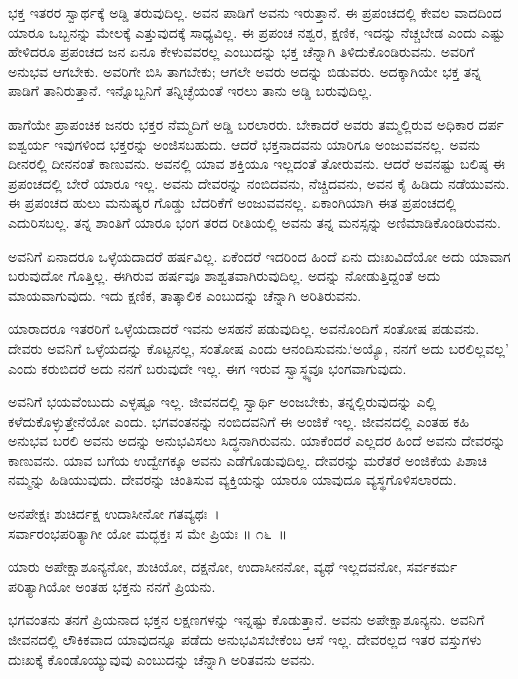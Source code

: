 ಭಕ್ತ ಇತರರ ಸ್ವಾರ್ಥಕ್ಕೆ ಅಡ್ಡಿ ತರುವುದಿಲ್ಲ. ಅವನ ಪಾಡಿಗೆ ಅವನು ಇರುತ್ತಾನೆ. ಈ ಪ್ರಪಂಚದಲ್ಲಿ ಕೇವಲ ವಾದದಿಂದ ಯಾರೂ ಒಬ್ಬನನ್ನು ಮೇಲಕ್ಕೆ ಎತ್ತುವುದಕ್ಕೆ ಸಾಧ್ಯವಿಲ್ಲ. ಈ ಪ್ರಪಂಚ ನಶ್ವರ, ಕ್ಷಣಿಕ, ಇದನ್ನು ನೆಚ್ಚಬೇಡ ಎಂದು ಎಷ್ಟು ಹೇಳಿದರೂ ಪ್ರಪಂಚದ ಜನ ಏನೂ ಕೇಳುವವರಲ್ಲ ಎಂಬುದನ್ನು ಭಕ್ತ ಚೆನ್ನಾಗಿ ತಿಳಿದುಕೊಂಡಿರುವನು. ಅವರಿಗೆ ಅನುಭವ ಆಗಬೇಕು. ಅವರಿಗೇ ಬಿಸಿ ತಾಗಬೇಕು; ಆಗಲೇ ಅವರು ಅದನ್ನು ಬಿಡುವರು. ಅದಕ್ಕಾಗಿಯೇ ಭಕ್ತ ತನ್ನ ಪಾಡಿಗೆ ತಾನಿರುತ್ತಾನೆ. ಇನ್ನೊಬ್ಬನಿಗೆ ತನ್ನಿಚ್ಛೆಯಂತೆ ಇರಲು ತಾನು ಅಡ್ಡಿ ಬರುವುದಿಲ್ಲ.

ಹಾಗೆಯೇ ಪ್ರಾಪಂಚಿಕ ಜನರು ಭಕ್ತರ ನೆಮ್ಮದಿಗೆ ಅಡ್ಡಿ ಬರಲಾರರು. ಬೇಕಾದರೆ ಅವರು ತಮ್ಮಲ್ಲಿರುವ ಅಧಿಕಾರ ದರ್ಪ ಐಶ್ವರ್ಯ ಇವುಗಳಿಂದ ಭಕ್ತರನ್ನು ಅಂಜಿಸಬಹುದು. ಆದರೆ ಭಕ್ತನಾದವನು ಯಾರಿಗೂ ಅಂಜುವವನಲ್ಲ. ಅವನು ದೀನರಲ್ಲಿ ದೀನನಂತೆ ಕಾಣುವನು. ಅವನಲ್ಲಿ ಯಾವ ಶಕ್ತಿಯೂ ಇಲ್ಲದಂತೆ ತೋರುವನು. ಆದರೆ ಅವನಷ್ಟು ಬಲಿಷ್ಠ ಈ ಪ್ರಪಂಚದಲ್ಲಿ ಬೇರೆ ಯಾರೂ ಇಲ್ಲ. ಅವನು ದೇವರನ್ನು ನಂಬಿದವನು, ನೆಚ್ಚಿದವನು, ಅವನ ಕೈ ಹಿಡಿದು ನಡೆಯುವನು. ಈ ಪ್ರಪಂಚದ ಹುಲು ಮನುಷ್ಯರ ಗೊಡ್ಡು ಬೆದರಿಕೆಗೆ ಅಂಜುವವನಲ್ಲ. ಏಕಾಂಗಿಯಾಗಿ ಈತ ಪ್ರಪಂಚದಲ್ಲಿ ಎದುರಿಸಬಲ್ಲ. ತನ್ನ ಶಾಂತಿಗೆ ಯಾರೂ ಭಂಗ ತರದ ರೀತಿಯಲ್ಲಿ ಅವನು ತನ್ನ ಮನಸ್ಸನ್ನು ಅಣಿಮಾಡಿಕೊಂಡಿರುವನು.

ಅವನಿಗೆ ಏನಾದರೂ ಒಳ್ಳೆಯದಾದರೆ ಹರ್ಷವಿಲ್ಲ. ಏಕೆಂದರೆ ಇದರಿಂದ ಹಿಂದೆ ಏನು ದುಃಖವಿದೆಯೋ ಅದು ಯಾವಾಗ ಬರುವುದೋ ಗೊತ್ತಿಲ್ಲ. ಈಗಿರುವ ಹರ್ಷವೂ ಶಾಶ್ವತವಾಗಿರುವುದಿಲ್ಲ. ಅದನ್ನು ನೋಡುತ್ತಿದ್ದಂತೆ ಅದು ಮಾಯವಾಗುವುದು. ಇದು ಕ್ಷಣಿಕ, ತಾತ್ಕಾಲಿಕ ಎಂಬುದನ್ನು ಚೆನ್ನಾಗಿ ಅರಿತಿರುವನು.

ಯಾರಾದರೂ ಇತರರಿಗೆ ಒಳ್ಳೆಯದಾದರೆ ಇವನು ಅಸಹನೆ ಪಡುವುದಿಲ್ಲ. ಅವನೊಂದಿಗೆ ಸಂತೋಷ ಪಡುವನು. ದೇವರು ಅವನಿಗೆ ಒಳ್ಳೆಯದನ್ನು ಕೊಟ್ಟನಲ್ಲ, ಸಂತೋಷ ಎಂದು ಆನಂದಿಸು\-ವನು.‘ಅಯ್ಯೊ, ನನಗೆ ಅದು ಬರಲಿಲ್ಲವಲ್ಲ’ ಎಂದು ಕರುಬಿದರೆ ಅದು ನನಗೆ ಬರುವುದೇ ಇಲ್ಲ. ಈಗ ಇರುವ ಸ್ವಾಸ್ಥ್ಯವೂ ಭಂಗವಾಗುವುದು.

ಅವನಿಗೆ ಭಯವೆಂಬುದು ಎಳ್ಳಷ್ಟೂ ಇಲ್ಲ. ಜೀವನದಲ್ಲಿ ಸ್ವಾರ್ಥಿ ಅಂಜಬೇಕು, ತನ್ನಲ್ಲಿರುವುದನ್ನು ಎಲ್ಲಿ ಕಳೆದುಕೊಳ್ಳುತ್ತೇನೆಯೋ ಎಂದು. ಭಗವಂತನನ್ನು ನಂಬಿದವನಿಗೆ ಈ ಅಂಜಿಕೆ ಇಲ್ಲ. ಜೀವನದಲ್ಲಿ ಎಂತಹ ಕಹಿ ಅನುಭವ ಬರಲಿ ಅವನು ಅದನ್ನು ಅನುಭವಿಸಲು ಸಿದ್ಧನಾಗಿರುವನು. ಯಾಕೆಂದರೆ ಎಲ್ಲದರ ಹಿಂದೆ ಅವನು ದೇವರನ್ನು ಕಾಣುವನು. ಯಾವ ಬಗೆಯ ಉದ್ವೇಗಕ್ಕೂ ಅವನು ಎಡೆಗೊಡುವುದಿಲ್ಲ. ದೇವರನ್ನು ಮರೆತರೆ ಅಂಜಿಕೆಯ ಪಿಶಾಚಿ ನಮ್ಮನ್ನು ಹಿಡಿಯುವುದು. ದೇವರನ್ನು ಚಿಂತಿಸುವ ವ್ಯಕ್ತಿಯನ್ನು ಯಾರೂ ಯಾವುದೂ ವ್ಯಸ್ಥಗೊಳಿಸಲಾರದು.

\begin{shloka}
ಅನಪೇಕ್ಷಃ ಶುಚಿರ್ದಕ್ಷ ಉದಾಸೀನೋ ಗತವ್ಯಥಃ~।\\ಸರ್ವಾರಂಭಪರಿತ್ಯಾಗೀ ಯೋ ಮದ್ಭಕ್ತಃ ಸ ಮೇ ಪ್ರಿಯಃ \hfill॥ ೧೬~॥
\end{shloka}

\begin{artha}
ಯಾರು ಅಪೇಕ್ಷಾಶೂನ್ಯನೋ, ಶುಚಿಯೋ, ದಕ್ಷನೋ, ಉದಾಸೀನನೋ, ವ್ಯಥೆ ಇಲ್ಲದವನೋ, ಸರ್ವಕರ್ಮ ಪರಿತ್ಯಾಗಿಯೋ ಅಂತಹ ಭಕ್ತನು ನನಗೆ ಪ್ರಿಯನು.
\end{artha}

ಭಗವಂತನು ತನಗೆ ಪ್ರಿಯನಾದ ಭಕ್ತನ ಲಕ್ಷಣಗಳನ್ನು ಇನ್ನಷ್ಟು ಕೊಡುತ್ತಾನೆ. ಅವನು ಅಪೇಕ್ಷಾಶೂನ್ಯನು. ಅವನಿಗೆ ಜೀವನದಲ್ಲಿ ಲೌಕಿಕವಾದ ಯಾವುದನ್ನೂ ಪಡೆದು ಅನುಭವಿಸ\-ಬೇಕೆಂಬ ಆಸೆ ಇಲ್ಲ. ದೇವರಲ್ಲದ ಇತರ ವಸ್ತುಗಳು ದುಃಖಕ್ಕೆ ಕೊಂಡೊಯ್ಯುವುವು ಎಂಬುದನ್ನು ಚೆನ್ನಾಗಿ ಅರಿತವನು ಅವನು.


